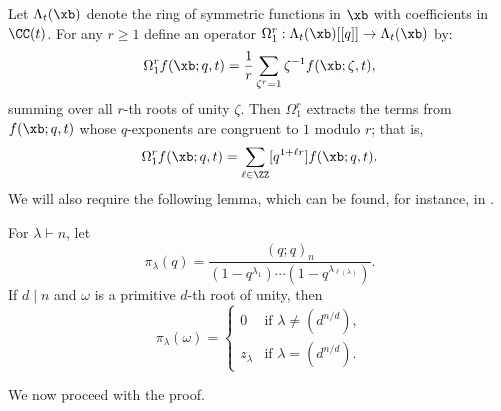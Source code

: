 Let $\Lambda_t(\xb)$ denote the ring of symmetric functions in $\xb$ with coefficients in $\CC(t)$. For any $r \ge 1$ define an operator $\Omega^r_1 : \Lambda_t(\xb)[[q]] \to \Lambda_t(\xb)$ by:
\[
\Omega^r_1f(\xb;q,t) = \frac{1}{r} \sum_{\zeta^r = 1} \zeta^{-1} f(\xb;\zeta,t),
\]
summing over all $r$-th roots of unity $\zeta$. Then $\Omega^r_1$ extracts the terms from $f(\xb;q,t)$ whose $q$-exponents are congruent to $1$ modulo $r$; that is,
\[
\Omega^r_1f(\xb;q,t) = \sum_{\ell \in \ZZ} [q^{1+\ell r}]f(\xb;q,t).
\]
We will also require the following lemma, which can be found, for instance, in \cite{Reu}.
\begin{lemma}\label{lem:reu}
    For $\lambda \vdash n$, let
    \[
    \pi_\lambda(q) = \frac{(q;q)_n}{(1-q^{\lambda_1}) \cdots (1-q^{\lambda_{\ell(\lambda)}})}.
    \]
    If $d \mid n$ and $\omega$ is a primitive $d$-th root of unity, then
    \[
    \pi_\lambda(\omega) = \begin{cases}
        0 & \text{if } \lambda \neq (d^{n/d}), \\
        z_\lambda & \text{if } \lambda = (d^{n/d}).
    \end{cases}
    \]
\end{lemma}
We now proceed with the proof.
